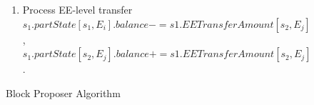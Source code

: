 \documentclass{IEEEtran}
\begin{document}
\begin{figure}[h]
{\begin{minipage}{\textwidth}
\begin{enumerate}
\begin{enumerate}
\begin{itemize}
\begin{itemize}
			$s_1.EETransferAmount[s_2,E_j] += x_n$.
		\end{itemize}
	\end{itemize}
	\item Process EE-level transfer\\
		$s_1.partState[s_1,E_i].balance -= s1.EETransferAmount[s_2,E_j]$, \\
		$s_1.partState[s_2,E_j].balance += s1.EETransferAmount[s_2,E_j]$.
    \end{enumerate}
\end{enumerate} 
\end{minipage}}
\caption{Block Proposer Algorithm}
\label{fig:algo}
\end{figure}





\end{document}
